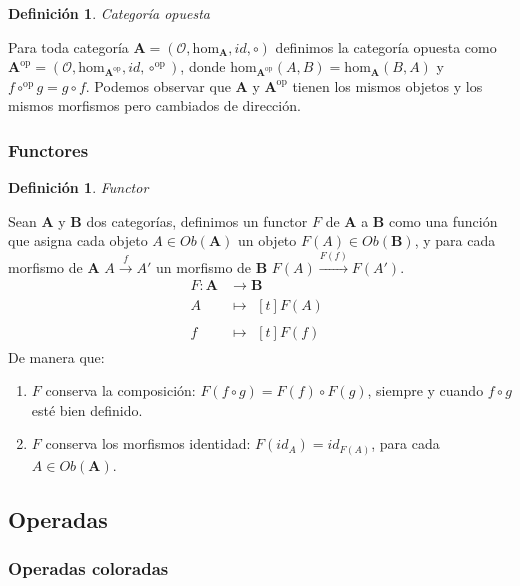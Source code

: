 \documentclass[11pt,a4paper,openright,oneside]{article}
\numberwithin{equation}{section}
\newtheorem{defi}[teo]{Definici\'on}
\theoremstyle{definition}
\begin{document}
\begin{defi}
    Categor\'ia opuesta
\end{defi}
Para toda categor\'ia $\mathbf{A} = (\mathcal{O}, \text{hom}_{\mathbf{A}}, \mathit{id}, \circ)$ definimos la categor\'ia opuesta como $\mathbf{A}^{\text{op}} = (\mathcal{O}, \text{hom}_{\mathbf{A}^{\text{op}}}, \mathit{id}, \circ^{\text{op}})$,
donde $\text{hom}_{\mathbf{A}^{\text{op}}}(A,B) = \text{hom}_{\mathbf{A}}(B,A)$ y $f\circ^{\text{op}}g = g\circ f$. Podemos observar que $\mathbf{A}$ y $\mathbf{A}^{\text{op}}$ tienen los mismos objetos y los mismos morfismos pero cambiados de direcci\'on.

\subsubsection{Functores}
\begin{defi}
    Functor
\end{defi}
Sean $\mathbf{A}$ y $\mathbf{B}$ dos categor\'ias, definimos un functor $F$ de $\mathbf{A}$ a $\mathbf{B}$ como una funci\'on que asigna cada objeto $A \in\mathit{Ob}(\mathbf{A})$ un objeto $F(A) \in\mathit{Ob}(\mathbf{B})$,
y para cada morfismo de $\mathbf{A}$ $A \overset{f}{\longrightarrow} A'$ un morfismo de $\mathbf{B}$ $F(A) \overset{F(f)}{\longrightarrow} F(A')$.
\begin{align*}
    F: \mathbf{A} & \longrightarrow \mathbf{B} \\
    A & \longmapsto\!
    \begin{aligned}[t]
        F(A)
    \end{aligned} \\
    f & \longmapsto\!
    \begin{aligned}[t]
    F(f)
    \end{aligned} 
\end{align*}
De manera que:
\begin{enumerate}[(1)]
    \item $F$ conserva la composici\'on: $F(f\circ g) = F(f)\circ F(g)$, siempre y cuando $f\circ g$ est\'e bien definido.
    \item $F$ conserva los morfismos identidad: $F(\mathit{id}_A)=\mathit{id}_{F(A)}$, para cada $A \in\mathit{Ob}(\mathbf{A})$.
\end{enumerate}

\subsection{Operadas}
\subsubsection{Operadas coloradas}
\newpage
\end{document}
